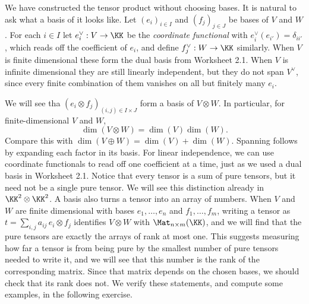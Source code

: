\documentclass[12pt,reqno]{amsart}
\begin{document}
\hrulefill

We have constructed the tensor product without choosing bases. It is natural to ask what a basis of it looks like. Let $(e_i)_{i\in I}$ and $(f_j)_{j\in J}$ be bases of $V$ and $W$. For each $i\in I$ let $e_i^{\vee}:V\to\KK$ be the \emph{coordinate functional} with $e_i^{\vee}(e_{i'})=\delta_{ii'}$, which reads off the coefficient of $e_i$, and define $f_j^{\vee}:W\to\KK$ similarly. When $V$ is finite dimensional these form the dual basis from Worksheet 2.1. When $V$ is infinite dimensional they are still linearly independent, but they do not span $V^{\vee}$, since every finite combination of them vanishes on all but finitely many $e_i$.

We will see tha $(e_i\otimes f_j)_{(i,j)\in I\times J}$ form a basis of $V\otimes W$. In particular, for finite-dimensional $V$ and $W$,
\[
\dim(V\otimes W)=\dim(V)\dim(W).
\]
Compare this with $\dim(V\oplus W)=\dim(V)+\dim(W)$. Spanning follows by expanding each factor in its basis. For linear independence, we can use coordinate functionals to read off one coefficient at a time, just as we used a dual basis in Worksheet 2.1. Notice that every tensor is a sum of pure tensors, but it need not be a single pure tensor. We will see this distinction already in $\KK^2\otimes\KK^2$. A basis also turns a tensor into an array of numbers. When $V$ and $W$ are finite dimensional with bases $e_1,\ldots,e_n$ and $f_1,\ldots,f_m$, writing a tensor as $t=\sum_{i,j}a_{ij}\,e_i\otimes f_j$ identifies $V\otimes W$ with $\Mat_{n\times m}(\KK)$, and we will find that the pure tensors are exactly the arrays of rank at most one. This suggests measuring how far a tensor is from being pure by the smallest number of pure tensors needed to write it, and we will see that this number is the rank of the corresponding matrix. Since that matrix depends on the chosen bases, we should check that its rank does not. We verify these statements, and compute some examples, in the following exercise.

\hrulefill
\end{document}
